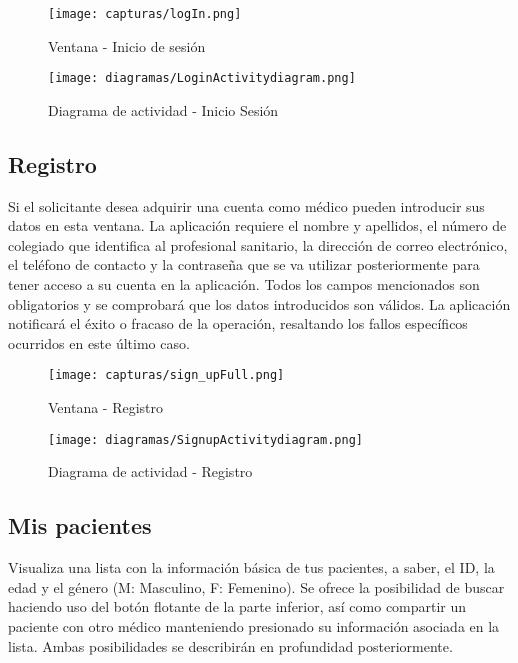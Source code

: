 \documentclass[11pt,spanish,
		listoftables,listoffigures]
		{tfgplantilla}
\begin{document}
\begin{figure}[H]
\centering
\texttt{[image: capturas/logIn.png]}
\caption{Ventana - Inicio de sesión}
\end{figure}

\newpage
\begin{figure}[H]
\centering
\texttt{[image: diagramas/LoginActivitydiagram.png]}
\caption{Diagrama de actividad - Inicio Sesión}
\end{figure}

\newpage
\subsection {Registro}

Si el solicitante desea adquirir una cuenta como médico pueden introducir sus datos en esta ventana. La aplicación requiere el nombre y apellidos, el número de colegiado que identifica al profesional sanitario, la dirección de correo electrónico, el teléfono de contacto y la contraseña que se va utilizar posteriormente para tener acceso a su cuenta en la aplicación. Todos los campos mencionados son obligatorios y se comprobará que los datos introducidos son válidos.
La aplicación notificará el éxito o fracaso de la operación, resaltando los fallos específicos ocurridos en este último caso.

\begin{figure}[H]
\centering
\texttt{[image: capturas/sign\_upFull.png]}
\caption{Ventana - Registro}
\end{figure}

\begin{figure}[H]
\centering
\texttt{[image: diagramas/SignupActivitydiagram.png]}
\caption{Diagrama de actividad - Registro}
\end{figure}

\subsection {Mis pacientes}

Visualiza una lista con la información básica de tus pacientes, a saber, el ID, la edad y el género (M: Masculino, F: Femenino). Se ofrece la posibilidad de buscar haciendo uso del botón flotante de la parte inferior, así como compartir un paciente con otro médico manteniendo presionado su información asociada en la lista. Ambas posibilidades se describirán en profundidad posteriormente. 
\end{document}
